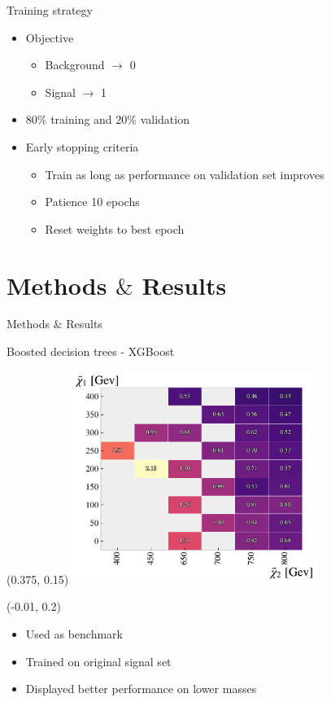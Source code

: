 \documentclass[UKenglish]{beamer}
\begin{document}
\begin{frame}{Training strategy}
    \begin{itemize}
        \item Objective
        \begin{itemize}
            \item Background $\rightarrow$ 0 
            \item Signal $\rightarrow$ 1
        \end{itemize}
        \item $80\%$ training and $20\%$ validation 
        \item Early stopping criteria
        \begin{itemize}
            \item Train as long as performance on validation set improves 
            \item Patience 10 epochs
            \item Reset weights to best epoch
        \end{itemize}
    \end{itemize}
\end{frame}



\section{Methods $\&$ Results}
\begin{frame}{Methods $\&$ Results}
    \tableofcontents[currentsection]
\end{frame}


\begin{frame}{Boosted decision trees - XGBoost}
    \begin{textblock}{1}(0.375, 0.15)
        \includegraphics[width=0.6\textwidth]{figures/grids/XGBGridSig.pdf}    
    \end{textblock}
    \begin{textblock}{0.4}(-0.01, 0.2)
        \begin{itemize}
            \item Used as benchmark
            \item Trained on original signal set
            \item Displayed better performance on lower masses  
        \end{itemize}
    \end{textblock}
\end{frame}
\end{document}
